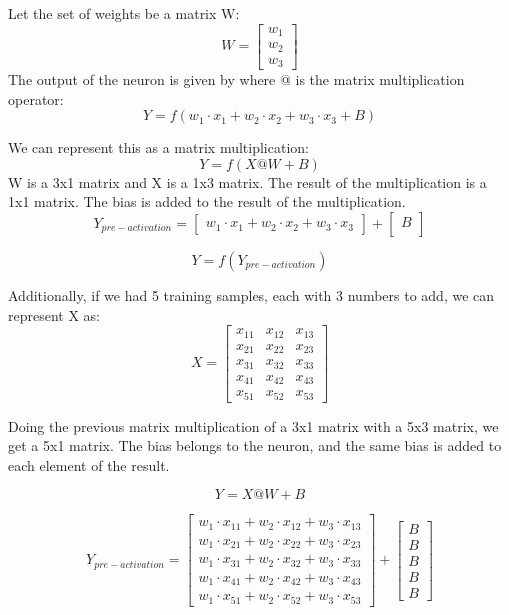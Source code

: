 \documentclass[12pt,a4paper]{article}
\begin{document}
Let the set of weights be a matrix W:
\[
    W = \begin{bmatrix}
        w_1 \\   w_2 \\   w_3
    \end{bmatrix}
\]
\indent The output of the neuron is given by where @ is the matrix multiplication operator:
\[
Y = f(w_1 \cdot x_1 + w_2 \cdot x_2 + w_3 \cdot x_3 + B)
\]

We can represent this as a matrix multiplication:
\[
Y = f(X @ W + B)
\]
W is a 3x1 matrix and X is a 1x3 matrix. The result of the multiplication is a 1x1 matrix. The bias is added to the result of the multiplication.
\[
Y_{pre-activation} = \begin{bmatrix}
    w_1 \cdot x_1 + w_2 \cdot x_2 + w_3 \cdot x_3 
\end{bmatrix} 
+ 
\begin{bmatrix}
    B \\
\end{bmatrix}
\]

\[
Y = f(Y_{pre-activation})
\]

Additionally, if we had 5 training samples, each with 3 numbers to add, we can represent X as:
\[
    X = \begin{bmatrix}
        x_{11} & x_{12} & x_{13} \\
        x_{21} & x_{22} & x_{23} \\
        x_{31} & x_{32} & x_{33} \\
        x_{41} & x_{42} & x_{43} \\
        x_{51} & x_{52} & x_{53}
    \end{bmatrix}
\]

Doing the previous matrix multiplication of a 3x1 matrix with a 5x3 matrix, we get a 5x1 matrix. The bias belongs to the neuron, and the same bias is added to each element of the result.

\[
Y = X@W + B
\]

\[
Y_{pre-activation} = \begin{bmatrix}
    w_1 \cdot x_{11} + w_2 \cdot x_{12} + w_3 \cdot x_{13} \\
    w_1 \cdot x_{21} + w_2 \cdot x_{22} + w_3 \cdot x_{23} \\
    w_1 \cdot x_{31} + w_2 \cdot x_{32} + w_3 \cdot x_{33} \\
    w_1 \cdot x_{41} + w_2 \cdot x_{42} + w_3 \cdot x_{43} \\
    w_1 \cdot x_{51} + w_2 \cdot x_{52} + w_3 \cdot x_{53}
\end{bmatrix}
+
\begin{bmatrix}
    B \\
    B \\
    B \\
    B \\
    B
\end{bmatrix}
\]
\end{document}
